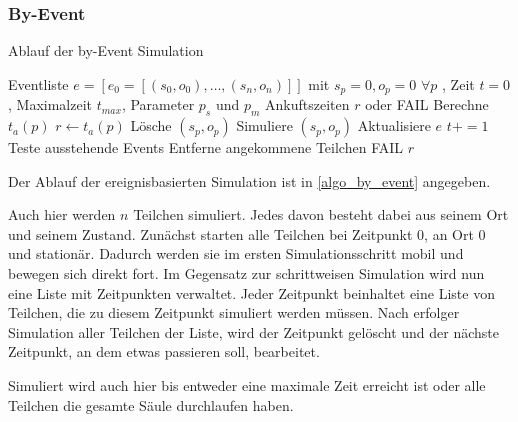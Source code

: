 


\subsubsection{By-Event}

\begin{algorithm}
\caption{Ablauf der by-Event Simulation}
\label{algo_by_event}
\begin{algorithmic}
\REQUIRE Eventliste $e= [e_0 = [(s_0, o_0), \ldots, (s_n, o_n)]]$ mit $s_p = 0, o_p = 0$ $\forall p$ , Zeit $t=0$, Maximalzeit $t_{max}$, Parameter $p_s$ und $p_m$
\ENSURE Ankuftszeiten $r$ oder FAIL
\STATE Berechne $t_a(p)$ 
\STATE $r \leftarrow t_a(p)$
\STATE Lösche $(s_p, o_p)$
\ELSE
\STATE Simuliere $(s_p, o_p)$
\STATE Aktualisiere $e$
\ENDIF
\ENDFOR
\STATE $t+=1$
\ENDWHILE
{}
\STATE Teste ausstehende Events
\STATE Entferne angekommene Teilchen
\RETURN FAIL
\ENDIF
\ENDIF
\RETURN $r$
\end{algorithmic}
\end{algorithm}

Der Ablauf der ereignisbasierten Simulation ist in \ref{algo_by_event} angegeben.

Auch hier werden $n$ Teilchen simuliert. Jedes davon besteht dabei aus seinem Ort und seinem Zustand. 
Zunächst starten alle Teilchen bei Zeitpunkt $0$, an Ort $0$ und stationär. Dadurch werden sie im ersten Simulationsschritt mobil und bewegen sich direkt fort. 
Im Gegensatz zur schrittweisen Simulation wird nun eine Liste mit Zeitpunkten verwaltet. Jeder Zeitpunkt beinhaltet eine Liste von Teilchen, die zu diesem Zeitpunkt simuliert werden müssen. Nach erfolger Simulation aller Teilchen der Liste, wird der Zeitpunkt gelöscht und der nächste Zeitpunkt, an dem etwas passieren soll, bearbeitet.

Simuliert wird auch hier bis entweder eine maximale Zeit erreicht ist oder alle Teilchen die gesamte Säule durchlaufen haben.

